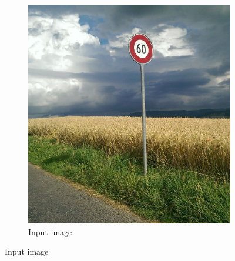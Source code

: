 \documentclass[a4paper]{article}
\begin{document}
\begin{figure}[H]
	\begin{subfigure}[h]{0.24\textwidth}
		\centering
		\includegraphics[width=\textwidth]{road}
		\caption*{Input image}
	\end{subfigure}
	

\end{figure}
\end{document}
